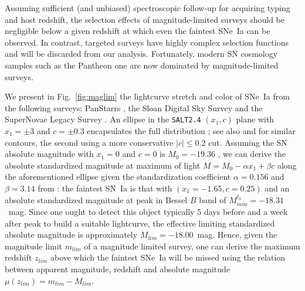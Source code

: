 \documentclass[]{aa} %
\begin{document}
Assuming sufficient (and unbiased) spectroscopic follow-up for acquiring typing
and host redshift, the selection effects of magnitude-limited surveys should be
negligible below a given redshift at which even the faintest SNe~Ia can be
observed. In contrast, targeted surveys have highly complex selection functions
and will be discarded from our analysis. Fortunately, modern SN cosmology
samples such as the Pantheon one are now dominated by magnitude-limited
surveys.

We present in Fig.~\ref{fig:maglim} the lightcurve stretch and color of SNe~Ia
from the following surveys: PanStarrs \citep[PS1][]{rest2014}, the Sloan Digital
Sky Survey \citep[SDSS][]{frieman2008} and the SuperNovae Legacy Survey
\citep[SNLS][]{astier2006}. An ellipse in the \textsc{\texttt{SALT2.4}} $(x_1,
c)$ plane with $x_1 = \pm 3$ and $c = \pm 0.3$ encapsulates the full
distribution \citep{guy2007,betoule2014}; see also \citet{bazin2011} and
\citet{campbell2013} for similar contours, the second using a more conservative
$|c| \leq 0.2$ cut.  Assuming the SN absolute magnitude with $x_1=0$ and $c=0$
is $M_0=-19.36$ \citep{kessler2009,scolnic2014}, we can derive the absolute
standardized magnitude at maximum of light $M = M_0 - \alpha x_1 + \beta c$
along the aforementioned ellipse given the standardization coefficient
$\alpha=0.156$ and $\beta=3.14$ from \cite{scolnic2018a}: the faintest SN~Ia is
that with $(x_1=-1.65, c=0.25)$ and an absolute standardized magnitude at peak
in Bessel $B$ band of $M^{t_0}_{min} = -18.31$~mag. Since one ought to detect
this object typically 5 days before and a week after peak to build a suitable lightcurve, the effective limiting standardized
absolute magnitude is approximately $M_{lim} = -18.00$~mag. Hence, given the
magnitude limit $m_{lim}$ of a magnitude limited survey, one can derive the
maximum redshift $z_{lim}$ above which the faintest SNe~Ia will be missed using
the relation between apparent magnitude, redshift and absolute magnitude
$\mu(z_{lim}) = m_{lim} - M_{lim}$.
\end{document}
